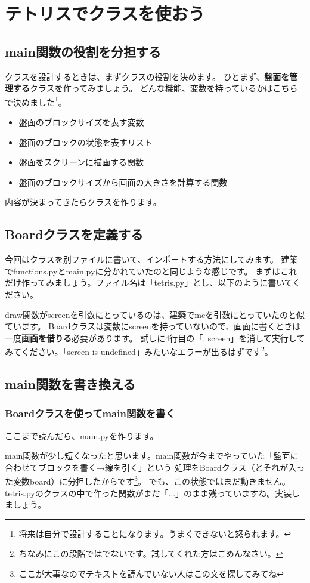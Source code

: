 \documentclass[12pt, a4paper, dvipdfmx]{book}
\begin{document}
\chapter{テトリスでクラスを使おう}
\section{main関数の役割を分担する}
クラスを設計するときは、まずクラスの役割を決めます。
ひとまず、\textbf{盤面を管理する}クラスを作ってみましょう。
どんな機能、変数を持っているかはこちらで決めました\footnote{将来は自分で設計することになります。うまくできないと怒られます。}。
\begin{itemize}
  \item 盤面のブロックサイズを表す変数
  \item 盤面のブロックの状態を表すリスト
  \item 盤面をスクリーンに描画する関数
  \item 盤面のブロックサイズから画面の大きさを計算する関数
\end{itemize}
内容が決まってきたらクラスを作ります。
\section{Boardクラスを定義する}
今回はクラスを別ファイルに書いて、インポートする方法にしてみます。
建築でfunctions.pyとmain.pyに分かれていたのと同じような感じです。
まずはこれだけ作ってみましょう。ファイル名は「tetris.py」とし、以下のように書いてください。

draw関数がscreenを引数にとっているのは、建築でmcを引数にとっていたのと似ています。
Boardクラスは変数にscreenを持っていないので、画面に書くときは一度\textbf{画面を借りる}必要があります。
試しに4行目の「, screen」を消して実行してみてください。「screen is undefined」みたいなエラーが出るはずです\footnote{ちなみにこの段階ではでないです。試してくれた方はごめんなさい。}。
\section{main関数を書き換える}
\subsection{Boardクラスを使ってmain関数を書く}
ここまで読んだら、main.pyを作ります。

main関数が少し短くなったと思います。main関数が今までやっていた「盤面に合わせてブロックを書く→線を引く」という
処理をBoardクラス（とそれが入った変数board）に分担したからです\footnote{ここが大事なのでテキストを読んでいない人はこの文を探してみてね}。
でも、この状態ではまだ動きません。tetris.pyのクラスの中で作った関数がまだ「...」のまま残っていますね。実装しましょう。
\end{document}
